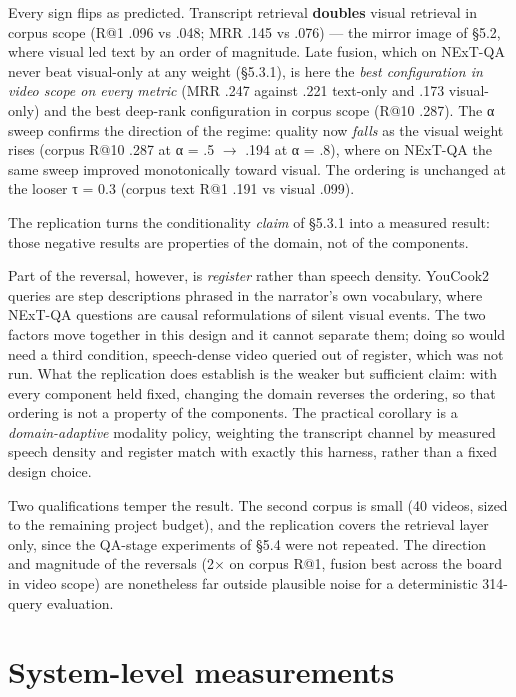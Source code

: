 Every sign flips as predicted. Transcript retrieval \textbf{doubles}
visual retrieval in corpus scope (R@1 .096 vs .048; MRR .145 vs .076)
--- the mirror image of §5.2, where visual led text by an order of
magnitude. Late fusion, which on NExT-QA never beat visual-only at any
weight (§5.3.1), is here the \emph{best configuration in video scope on
every metric} (MRR .247 against .221 text-only and .173 visual-only) and
the best deep-rank configuration in corpus scope (R@10 .287). The α
sweep confirms the direction of the regime: quality now \emph{falls} as
the visual weight rises (corpus R@10 .287 at α = .5
\ensuremath{\rightarrow} .194 at α = .8), where on NExT-QA the same
sweep improved monotonically toward visual. The ordering is unchanged at
the looser τ = 0.3 (corpus text R@1 .191 vs visual .099).

The replication turns the conditionality \emph{claim} of §5.3.1 into a
measured result: those negative results are properties of the domain,
not of the components.

Part of the reversal, however, is \emph{register} rather than speech
density. YouCook2 queries are step descriptions phrased in the
narrator's own vocabulary, where NExT-QA questions are causal
reformulations of silent visual events. The two factors move together in
this design and it cannot separate them; doing so would need a third
condition, speech-dense video queried out of register, which was not
run. What the replication does establish is the weaker but sufficient
claim: with every component held fixed, changing the domain reverses the
ordering, so that ordering is not a property of the components. The
practical corollary is a \emph{domain-adaptive} modality policy,
weighting the transcript channel by measured speech density and register
match with exactly this harness, rather than a fixed design choice.

Two qualifications temper the result. The second corpus is small (40
videos, sized to the remaining project budget), and the replication
covers the retrieval layer only, since the QA-stage experiments of §5.4
were not repeated. The direction and magnitude of the reversals (2× on
corpus R@1, fusion best across the board in video scope) are nonetheless
far outside plausible noise for a deterministic 314-query evaluation.

\section{System-level measurements}

